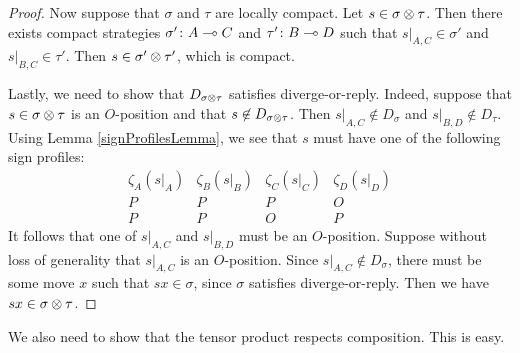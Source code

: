 \documentclass{article}
\begin{document}
\begin{proposition}
\begin{proof}
    Now suppose that $\sigma$ and $\tau$ are locally compact.  Let $s\in\sigma\otimes\tau$.  Then there exists compact strategies $\sigma'\colon A\multimap C$ and $\tau'\colon B\multimap D$ such that $s\vert_{A,C}\in\sigma'$ and $s\vert_{B,C}\in\tau'$.  Then $s\in\sigma'\otimes\tau'$, which is compact.

    Lastly, we need to show that $D_{\sigma\otimes\tau}$ satisfies diverge-or-reply.  Indeed, suppose that $s\in\sigma\otimes\tau$ is an $O$-position and that $s\not\in D_{\sigma\otimes\tau}$.  Then $s\vert_{A,C}\not\in D_\sigma$ and $s\vert_{B,D}\not\in D_\tau$.  Using Lemma \ref{signProfilesLemma}, we see that $s$ must have one of the following sign profiles:
    \[
      \begin{array}{cccc}
        \zeta_A(s\vert_A) & \zeta_B(s\vert_B) & \zeta_C(s\vert_C) & \zeta_D(s\vert_D) \\
        \hline
        P & P & P & O \\
        P & P & O & P
      \end{array}
      \]
    It follows that one of $s\vert_{A,C}$ and $s\vert_{B,D}$ must be an $O$-position.  Suppose without loss of generality that $s\vert_{A,C}$ is an $O$-position.  Since $s\vert_{A,C}\not\in D_\sigma$, there must be some move $x$ such that $sx\in\sigma$, since $\sigma$ satisfies diverge-or-reply.  Then we have $sx\in\sigma\otimes\tau$.
  \end{proof}
\end{proposition}

We also need to show that the tensor product respects composition.  This is easy.
\end{document}
